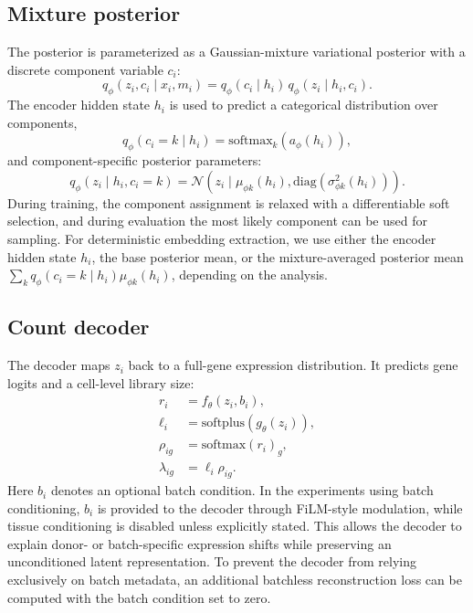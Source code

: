 \subsection{Mixture posterior}

The posterior is parameterized as a Gaussian-mixture variational posterior with a
discrete component variable \(c_i\):
\begin{equation}
    q_{\phi}(z_i,c_i \mid x_i,m_i)
    = q_{\phi}(c_i \mid h_i)\,
      q_{\phi}(z_i \mid h_i,c_i).
\end{equation}
The encoder hidden state \(h_i\) is used to predict a categorical distribution over
components,
\begin{equation}
    q_{\phi}(c_i=k \mid h_i)
    = \mathrm{softmax}_k(a_{\phi}(h_i)),
\end{equation}
and component-specific posterior parameters:
\begin{equation}
    q_{\phi}(z_i \mid h_i,c_i=k)
    =
    \mathcal{N}\left(
        z_i \mid \mu_{\phi k}(h_i), \mathrm{diag}(\sigma^2_{\phi k}(h_i))
    \right).
\end{equation}
During training, the component assignment is relaxed with a differentiable soft
selection, and during evaluation the most likely component can be used for sampling.
For deterministic embedding extraction, we use either the encoder hidden state
\(h_i\), the base posterior mean, or the mixture-averaged posterior mean
\(\sum_k q_{\phi}(c_i=k \mid h_i)\mu_{\phi k}(h_i)\), depending on the analysis.

\subsection{Count decoder}

The decoder maps \(z_i\) back to a full-gene expression distribution. It predicts gene
logits and a cell-level library size:
\begin{align}
    r_i &= f_{\theta}(z_i, b_i), \\
    \ell_i &= \mathrm{softplus}(g_{\theta}(z_i)), \\
    \rho_{ig} &= \mathrm{softmax}(r_i)_g, \\
    \lambda_{ig} &= \ell_i \rho_{ig}.
\end{align}
Here \(b_i\) denotes an optional batch condition. In the experiments using batch
conditioning, \(b_i\) is provided to the decoder through FiLM-style modulation, while
tissue conditioning is disabled unless explicitly stated. This allows the decoder to
explain donor- or batch-specific expression shifts while preserving an unconditioned
latent representation. To prevent the decoder from relying exclusively on batch
metadata, an additional batchless reconstruction loss can be computed with the batch
condition set to zero.

